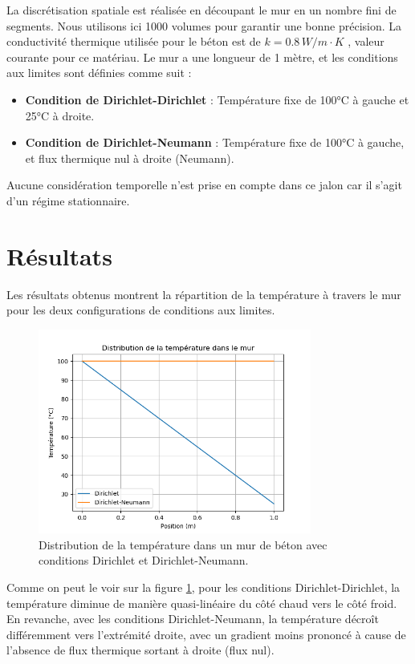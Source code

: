 \documentclass[a4paper,11pt]{article}
\begin{document}
La discrétisation spatiale est réalisée en découpant le mur en un nombre fini de segments. Nous utilisons ici 1000 volumes pour garantir une bonne précision. La conductivité thermique utilisée pour le béton est de $k = 0.8 \, W/m\cdot K$ \cite{sourceconductivity}, valeur courante pour ce matériau. Le mur a une longueur de 1 mètre, et les conditions aux limites sont définies comme suit :
\begin{itemize}
    \item \textbf{Condition de Dirichlet-Dirichlet} : Température fixe de 100°C à gauche et 25°C à droite.
    \item \textbf{Condition de Dirichlet-Neumann} : Température fixe de 100°C à gauche, et flux thermique nul à droite (Neumann).
\end{itemize}
Aucune considération temporelle n'est prise en compte dans ce jalon car il s'agit d'un régime stationnaire.

\section{Résultats}
Les résultats obtenus montrent la répartition de la température à travers le mur pour les deux configurations de conditions aux limites.

\begin{figure}[h!]
    \centering
    \includegraphics[width=0.8\textwidth]{img/Figure_1.png}
    \caption{Distribution de la température dans un mur de béton avec conditions Dirichlet et Dirichlet-Neumann.}
    \label{fig:temperature_distribution}
\end{figure}

Comme on peut le voir sur la figure \ref{fig:temperature_distribution}, pour les conditions Dirichlet-Dirichlet, la température diminue de manière quasi-linéaire du côté chaud vers le côté froid. En revanche, avec les conditions Dirichlet-Neumann, la température décroît différemment vers l'extrémité droite, avec un gradient moins prononcé à cause de l'absence de flux thermique sortant à droite (flux nul).
\end{document}

